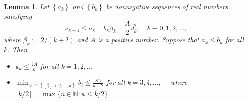 \documentclass[pdflatex,sn-mathphys-num]{sn-jnl}%
\newtheorem{lemma}[theorem]{Lemma} %
\theoremstyle{definition} %
\theoremstyle{remark} %
\begin{document}
\begin{lemma} \label{lemma:ak} \cite[Lemma 13.13]{beck2017first}
    Let $\left\{a_k\right\}$ and $\left\{b_k\right\}$ be nonnegative sequences of real numbers satisfying
    $$
    a_{k+1} \leq a_k-b_k \beta_k+\frac{A}{2} \beta_k^2, \quad k=0,1,2, \ldots,
    $$
    where $\beta_k:=2 /(k+2)$ and $A$ is a positive number. Suppose that $a_k \leq b_k$ for all $k$. Then
    \begin{itemize}
        \item[(1)]  $a_k \leq \frac{2 A}{k}$ for all $k=1,2,\ldots$
        \item[(2)] $\min _{\ell \in\left\{\left\lfloor\frac{k}{2}\right\rfloor+2, \ldots, k\right\}} b_{\ell} \leq \frac{8 A}{k-2}$ for all $k=3,4, \ldots, \quad$ where $\lfloor k / 2\rfloor=\max \{n \in \mathbb{N}: n \leq k / 2\}$.
    \end{itemize} 
\end{lemma}
\end{document}
